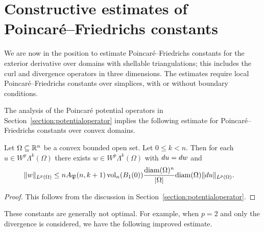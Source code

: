 \documentclass[10pt,letterpaper]{article}
\begin{document}
\section{Constructive estimates of Poincar\'e--Friedrichs constants}\label{section:poincarefriedrichs}

We are now in the position to estimate Poincar\'e--Friedrichs constants for the exterior derivative over domains with shellable triangulations; this includes the curl and divergence operators in three dimensions. 
The estimates require local Poincar\'e--Friedrichs constants over simplices, 
with or without boundary conditions. 

The analysis of the Poincar\'e potential operators in Section~\ref{section:potentialoperator}
implies the following estimate for Poincar\'e--Friedrichs constants over convex domains. 


\begin{lemma}\label{lemma:PFexteriorsimplex}
    Let $\Omega \subseteq {\mathbb R}^{n}$ be a convex bounded open set. 
    Let $0 \leq k < n$. 
    Then for each $u \in W^{p}\Lambda^{k}(\Omega)$ 
    there exists $w \in W^{p}\Lambda^{k}(\Omega)$ 
    with $d u = d w$ and 
    \begin{align*}
        \| w \|_{L^{p}(\Omega)}
        &
        \leq 
        n A_{{\mathfrak P}}(n,k+1) 
        \operatorname{vol}_{n}(B_1(0)) 
        \frac{ {\operatorname{diam}}(\Omega)^{n} }{|\Omega|} 
        {\operatorname{diam}}(\Omega)
        \| d u \|_{L^{p}(\Omega)}
        .
    \end{align*}
\end{lemma}
\begin{proof}
    This follows from the discussion in Section~\ref{section:potentialoperator}.
\end{proof}

These constants are generally not optimal. 
For example, when $p=2$ and only the divergence is considered, 
we have the following improved estimate. 
\end{document}
